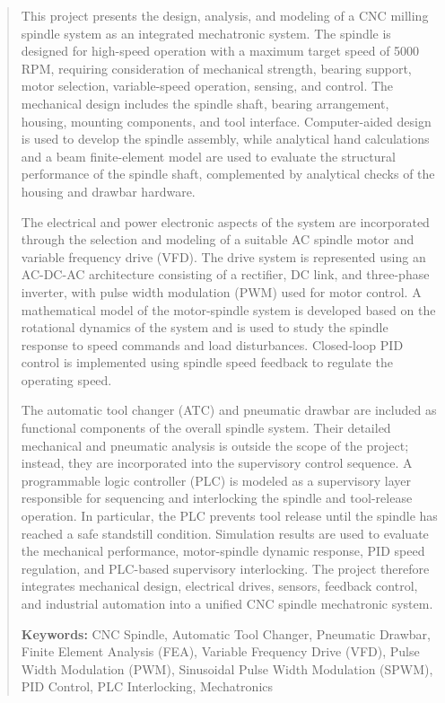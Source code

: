 \documentclass[12pt,a4paper]{report}
\begin{document}
	\begin{abstract}
		This project presents the design, analysis, and modeling of a CNC milling spindle system as an integrated mechatronic system. The spindle is designed for high-speed operation with a maximum target speed of 5000 RPM, requiring consideration of mechanical strength, bearing support, motor selection, variable-speed operation, sensing, and control. The mechanical design includes the spindle shaft, bearing arrangement, housing, mounting components, and tool interface. Computer-aided design is used to develop the spindle assembly, while 
analytical hand calculations and a beam finite-element model are used to evaluate the structural performance of the spindle shaft, complemented by analytical checks of the housing and drawbar hardware.
		
		The electrical and power electronic aspects of the system are incorporated through the selection and modeling of a suitable AC spindle motor and variable frequency drive (VFD). The drive system is represented using an AC-DC-AC architecture consisting of a rectifier, DC link, and three-phase inverter, with pulse width modulation (PWM) used for motor control. A mathematical model of the motor-spindle system is developed based on the rotational dynamics of the system and is used to study the spindle response to speed commands and load disturbances. Closed-loop PID control is implemented using spindle speed feedback to regulate the operating speed.
		
		The automatic tool changer (ATC) and pneumatic drawbar are included as functional components of the overall spindle system. Their detailed mechanical and pneumatic analysis is outside the scope of the project; instead, they are incorporated into the supervisory control sequence. A programmable logic controller (PLC) is modeled as a supervisory layer responsible for sequencing and interlocking the spindle and tool-release operation. In particular, the PLC prevents tool release until the spindle has reached a safe standstill condition. Simulation results are used to evaluate the mechanical performance, motor-spindle dynamic response, PID speed regulation, and PLC-based supervisory interlocking. The project therefore integrates mechanical design, electrical drives, sensors, feedback control, and industrial automation into a unified CNC spindle mechatronic system.
		
		\vspace{0.5cm}
		\noindent\textbf{Keywords:} CNC Spindle, Automatic Tool Changer, Pneumatic Drawbar, Finite Element Analysis (FEA), Variable Frequency Drive (VFD), Pulse Width Modulation (PWM), Sinusoidal Pulse Width Modulation (SPWM), PID Control, PLC Interlocking, Mechatronics
	\end{abstract}
	
\end{document}
